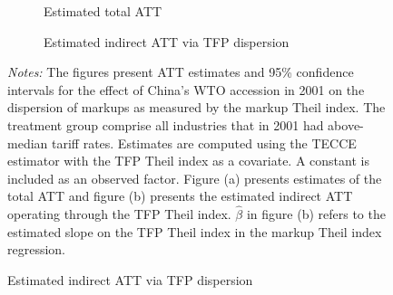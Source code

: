 \documentclass[12pt,fleqn]{article}
\begin{document}
  \begin{figure}
      \caption{Estimated ATTs of China's WTO accession in 2001 on the markup Theil index.}
      \label{fig:trade}
  
      \begin{subfigure}[b]{\textwidth}
          \caption{Estimated total ATT}
          \begin{adjustbox}{width=\textwidth}
            
          \end{adjustbox}
      \end{subfigure}
  
      \begin{subfigure}[b]{\textwidth}
          \caption{Estimated indirect ATT via TFP dispersion}
          \begin{adjustbox}{width=\textwidth}
            
          \end{adjustbox}
      \end{subfigure}
  
      {\footnotesize\emph{Notes:} The figures present ATT estimates and 95\% confidence intervals for the effect of China's WTO accession in 2001 on the dispersion of markups as measured by the markup Theil index. The treatment group comprise all industries that in 2001 had above-median tariff rates. Estimates are computed using the TECCE estimator with the TFP Theil index as a covariate. A constant is included as an observed factor. Figure (a) presents estimates of the total ATT and figure (b) presents the estimated indirect ATT operating through the TFP Theil index. $\hat{\beta}$ in figure (b) refers to the estimated slope on the TFP Theil index in the markup Theil index regression.}
  \end{figure}  
\end{document}
